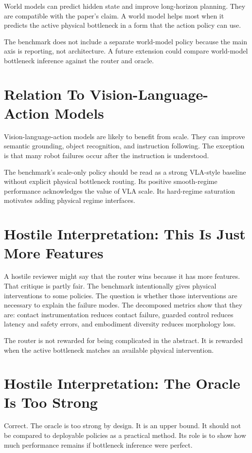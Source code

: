 World models can predict hidden state and improve long-horizon planning. They are compatible with the paper's claim. A world model helps most when it predicts the active physical bottleneck in a form that the action policy can use.

The benchmark does not include a separate world-model policy because the main axis is reporting, not architecture. A future extension could compare world-model bottleneck inference against the router and oracle.

\section{Relation To Vision-Language-Action Models}

Vision-language-action models are likely to benefit from scale. They can improve semantic grounding, object recognition, and instruction following. The exception is that many robot failures occur after the instruction is understood.

The benchmark's scale-only policy should be read as a strong VLA-style baseline without explicit physical bottleneck routing. Its positive smooth-regime performance acknowledges the value of VLA scale. Its hard-regime saturation motivates adding physical regime interfaces.

\section{Hostile Interpretation: This Is Just More Features}

A hostile reviewer might say that the router wins because it has more features. That critique is partly fair. The benchmark intentionally gives physical interventions to some policies. The question is whether those interventions are necessary to explain the failure modes. The decomposed metrics show that they are: contact instrumentation reduces contact failure, guarded control reduces latency and safety errors, and embodiment diversity reduces morphology loss.

The router is not rewarded for being complicated in the abstract. It is rewarded when the active bottleneck matches an available physical intervention.

\section{Hostile Interpretation: The Oracle Is Too Strong}

Correct. The oracle is too strong by design. It is an upper bound. It should not be compared to deployable policies as a practical method. Its role is to show how much performance remains if bottleneck inference were perfect.

